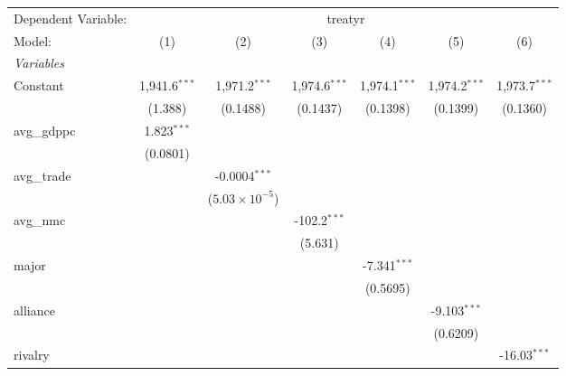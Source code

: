 \begingroup
\centering
\begin{tabular}{lcccccc}
   \tabularnewline \midrule \midrule
   Dependent Variable: & \multicolumn{6}{c}{treatyr}\\
   Model:         & (1)             & (2)                     & (3)             & (4)             & (5)             & (6)\\  
   \midrule
   \emph{Variables}\\
   Constant       & 1,941.6$^{***}$ & 1,971.2$^{***}$         & 1,974.6$^{***}$ & 1,974.1$^{***}$ & 1,974.2$^{***}$ & 1,973.7$^{***}$\\   
                  & (1.388)         & (0.1488)                & (0.1437)        & (0.1398)        & (0.1399)        & (0.1360)\\   
   avg\_gdppc     & 1.823$^{***}$   &                         &                 &                 &                 &   \\   
                  & (0.0801)        &                         &                 &                 &                 &   \\   
   avg\_trade     &                 & -0.0004$^{***}$         &                 &                 &                 &   \\   
                  &                 & ($5.03\times 10^{-5}$)  &                 &                 &                 &   \\   
   avg\_nmc       &                 &                         & -102.2$^{***}$  &                 &                 &   \\   
                  &                 &                         & (5.631)         &                 &                 &   \\   
   major          &                 &                         &                 & -7.341$^{***}$  &                 &   \\   
                  &                 &                         &                 & (0.5695)        &                 &   \\   
   alliance       &                 &                         &                 &                 & -9.103$^{***}$  &   \\   
                  &                 &                         &                 &                 & (0.6209)        &   \\   
   rivalry        &                 &                         &                 &                 &                 & -16.03$^{***}$\\   

\end{tabular}

